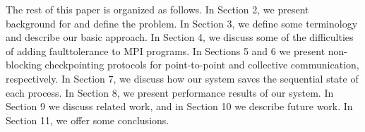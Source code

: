 The rest of this paper is organized as follows. In Section 2, we present background
for and define the problem. In Section 3, we define some terminology and describe
our basic approach. In Section 4, we discuss some of the difficulties of adding faulttolerance to MPI programs. In Sections 5 and 6 we present non-blocking checkpointing
protocols for point-to-point and collective communication, respectively. In Section 7,
we discuss how our system saves the sequential state of each process. In Section 8, we
present performance results of our system. In Section 9 we discuss related work, and in
Section 10 we describe future work. In Section 11, we offer some conclusions.
